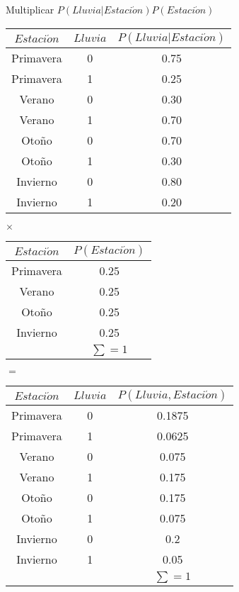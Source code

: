 \begin{example}{Multiplicar $P(Lluvia|Estaci\acute{o}n)P(Estaci\acute{o}n)$}
\begin{center}
\begin{tabular}{cc|c}
 $Estaci\acute{o}n$ & $Lluvia$ & $P(Lluvia|Estaci\acute{o}n)$ \\ \toprule
 \rowcolor{\colTableRow}Primavera & 0 & 0.75 \\
 \rowcolor{\colTableRow}Primavera & 1 & 0.25 \\
 \rowcolor{\colTableRowOne}Verano & 0 & 0.30 \\
 \rowcolor{\colTableRowOne}Verano & 1 & 0.70 \\
 \rowcolor{\colTableRowTwo}Otoño & 0 & 0.70 \\
 \rowcolor{\colTableRowTwo}Otoño & 1 & 0.30 \\
 \rowcolor{\colTableRowThree}Invierno & 0 & 0.80 \\
 \rowcolor{\colTableRowThree}Invierno & 1 & 0.20
\end{tabular}$\times$
\begin{tabular}{c|c}
 $Estaci\acute{o}n$ & $P(Estaci\acute{o}n)$ \\ \toprule
 \rowcolor{\colTableRow}Primavera & 0.25 \\
 \rowcolor{\colTableRowOne}Verano & 0.25 \\
 \rowcolor{\colTableRowTwo}Otoño & 0.25 \\
 \rowcolor{\colTableRowThree}Invierno & 0.25 \\
 \multicolumn{1}{c}{}  & $\sum=1$
\end{tabular}$=$

\begin{center}
\begin{tabular}{cc|c}
 $Estaci\acute{o}n$ & $Lluvia$ & $P(Lluvia,Estaci\acute{o}n)$ \\ \toprule
 \rowcolor{\colTableRow}Primavera & 0 & 0.1875 \\
 \rowcolor{\colTableRow}Primavera & 1 & 0.0625 \\
 \rowcolor{\colTableRowOne}Verano & 0 & 0.075 \\
 \rowcolor{\colTableRowOne}Verano & 1 & 0.175 \\
 \rowcolor{\colTableRowTwo}Otoño & 0 & 0.175 \\
 \rowcolor{\colTableRowTwo}Otoño & 1 & 0.075 \\
 \rowcolor{\colTableRowThree}Invierno & 0 & 0.2 \\
 \rowcolor{\colTableRowThree}Invierno & 1 & 0.05 \\
 \multicolumn{2}{c}{}  & $\sum=1$
\end{tabular}
\end{center}
\end{center}
\end{example}


